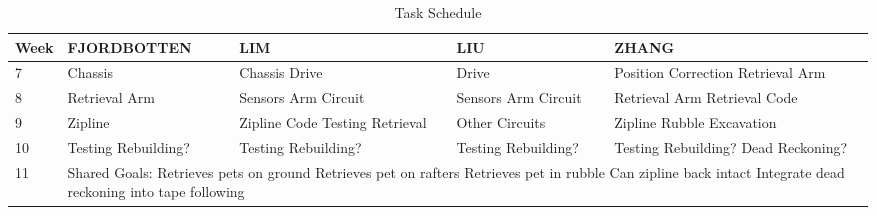 \documentclass[11pt, oneside]{article} %
\begin{document}
\begin{table}[ht]
	\caption{Task Schedule}
	\centering
	\begin{tabular}{ | p{1.3cm} | p{3.5cm} | p{3cm} | p{3cm} | p{3.5cm} |} 
	\hline
	\textbf{Week} & \textbf{FJORDBOTTEN} & \textbf{LIM} & \textbf{LIU} & \textbf{ZHANG} \\ \hline 
	7& Chassis & Chassis \newline Drive & Drive & Position Correction \newline Retrieval Arm \\ \hline
	8& Retrieval Arm & Sensors \newline Arm Circuit & Sensors \newline Arm Circuit & Retrieval Arm \newline Retrieval Code \\ \hline
	9& Zipline & Zipline Code \newline Testing Retrieval & Other Circuits & Zipline \newline Rubble Excavation \\ \hline
	10& Testing \newline Rebuilding? & Testing \newline Rebuilding? & Testing \newline Rebuilding? & Testing \newline Rebuilding? \newline Dead Reckoning? \\ \hline
	11 \newline 12 \newline 13 &
	\multicolumn{4}{l|}{\parbox{10cm}{Shared Goals: \newline Retrieves pets on ground \newline Retrieves pet on rafters \newline Retrieves pet in rubble \newline Can zipline back intact \newline Integrate dead reckoning into tape following}} \\ \hline
	\end{tabular}
	\label{table:Task Schedule}
\end{table}

\clearpage

\end{document}
